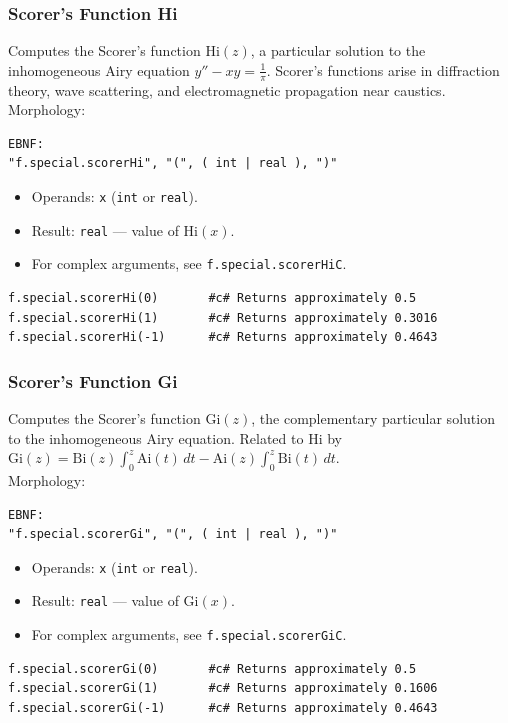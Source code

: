 \subsubsection{Scorer's Function Hi}
Computes the Scorer's function $\text{Hi}(z)$, a particular solution to the inhomogeneous Airy equation $y'' - xy = \frac{1}{\pi}$. Scorer's functions arise in diffraction theory, wave scattering, and electromagnetic propagation near caustics. \\
Morphology:
\begin{verbatim}
EBNF:
"f.special.scorerHi", "(", ( int | real ), ")"
\end{verbatim}
\begin{itemize}
\item Operands: \texttt{x} (\texttt{int} or \texttt{real}).
\item Result: \texttt{real} --- value of $\text{Hi}(x)$.
\item For complex arguments, see \texttt{f.special.scorerHiC}.
\end{itemize}
\begin{verbatim}
f.special.scorerHi(0)       #c# Returns approximately 0.5
f.special.scorerHi(1)       #c# Returns approximately 0.3016
f.special.scorerHi(-1)      #c# Returns approximately 0.4643
\end{verbatim}

\subsubsection{Scorer's Function Gi}
Computes the Scorer's function $\text{Gi}(z)$, the complementary particular solution to the inhomogeneous Airy equation. Related to $\text{Hi}$ by $\text{Gi}(z) = \text{Bi}(z) \int_0^z \text{Ai}(t)\,dt - \text{Ai}(z) \int_0^z \text{Bi}(t)\,dt$. \\
Morphology:
\begin{verbatim}
EBNF:
"f.special.scorerGi", "(", ( int | real ), ")"
\end{verbatim}
\begin{itemize}
\item Operands: \texttt{x} (\texttt{int} or \texttt{real}).
\item Result: \texttt{real} --- value of $\text{Gi}(x)$.
\item For complex arguments, see \texttt{f.special.scorerGiC}.
\end{itemize}
\begin{verbatim}
f.special.scorerGi(0)       #c# Returns approximately 0.5
f.special.scorerGi(1)       #c# Returns approximately 0.1606
f.special.scorerGi(-1)      #c# Returns approximately 0.4643
\end{verbatim}


